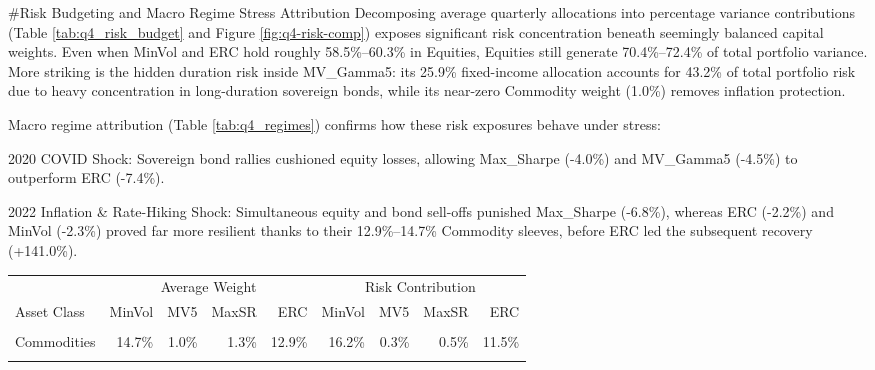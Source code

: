 \documentclass[11pt,preprint]{elsarticle}
\let\origtable\table
\let\endorigtable\endtable
\renewenvironment{table}[1][2] {
    \expandafter\origtable\expandafter[H]
} {
    \endorigtable
}
\numberwithin{equation}{section}
\numberwithin{figure}{section}
\numberwithin{table}{section}
\begin{document}
\#Risk Budgeting and Macro Regime Stress Attribution Decomposing average
quarterly allocations into percentage variance contributions (Table
\ref{tab:q4_risk_budget} and Figure \ref{fig:q4-risk-comp}) exposes
significant risk concentration beneath seemingly balanced capital
weights. Even when MinVol and ERC hold roughly 58.5\%--60.3\% in
Equities, Equities still generate 70.4\%--72.4\% of total portfolio
variance. More striking is the hidden duration risk inside MV\_Gamma5:
its 25.9\% fixed-income allocation accounts for 43.2\% of total
portfolio risk due to heavy concentration in long-duration sovereign
bonds, while its near-zero Commodity weight (1.0\%) removes inflation
protection.

Macro regime attribution (Table \ref{tab:q4_regimes}) confirms how these
risk exposures behave under stress:

2020 COVID Shock: Sovereign bond rallies cushioned equity losses,
allowing Max\_Sharpe (-4.0\%) and MV\_Gamma5 (-4.5\%) to outperform ERC
(-7.4\%).

2022 Inflation \& Rate-Hiking Shock: Simultaneous equity and bond
sell-offs punished Max\_Sharpe (-6.8\%), whereas ERC (-2.2\%) and MinVol
(-2.3\%) proved far more resilient thanks to their 12.9\%--14.7\%
Commodity sleeves, before ERC led the subsequent recovery (+141.0\%).

\begin{table}[!h]
\centering
\caption{\label{tab:q4_risk_budget}Average Portfolio Weights and Percentage Risk Contributions by Asset Class}
\centering
\begin{tabular}[t]{lrrrrrrrr}
\toprule
\multicolumn{1}{c}{ } & \multicolumn{4}{c}{Average Weight} & \multicolumn{4}{c}{Risk Contribution} \\
\cmidrule(l{3pt}r{3pt}){2-5} \cmidrule(l{3pt}r{3pt}){6-9}
Asset Class & MinVol & MV5 & MaxSR & ERC & MinVol & MV5 & MaxSR & ERC\\
\midrule
\cellcolor{gray!10}{Bonds} & \cellcolor{gray!10}{25.0\%} & \cellcolor{gray!10}{25.9\%} & \cellcolor{gray!10}{25.7\%} & \cellcolor{gray!10}{28.6\%} & \cellcolor{gray!10}{11.4\%} & \cellcolor{gray!10}{43.2\%} & \cellcolor{gray!10}{27.1\%} & \cellcolor{gray!10}{18.1\%}\\
Commodities & 14.7\% & 1.0\% & 1.3\% & 12.9\% & 16.2\% & 0.3\% & 0.5\% & 11.5\%\\
\cellcolor{gray!10}{Equities} & \cellcolor{gray!10}{60.3\%} & \cellcolor{gray!10}{73.1\%} & \cellcolor{gray!10}{73.0\%} & \cellcolor{gray!10}{58.5\%} & \cellcolor{gray!10}{72.4\%} & \cellcolor{gray!10}{56.5\%} & \cellcolor{gray!10}{72.4\%} & \cellcolor{gray!10}{70.4\%}\\
\bottomrule
\end{tabular}
\end{table}
\end{document}

